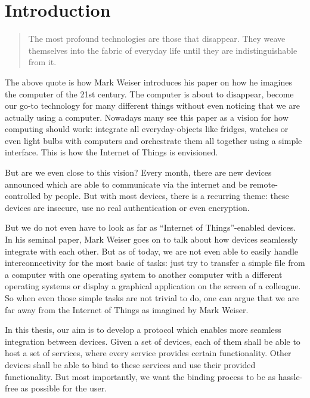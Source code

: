 \section{Introduction}

\begin{quote}
    The most profound technologies are those that disappear.
    They weave themselves into the fabric of everyday life until they are indistinguishable from it. \cite{weiser1991computer}
\end{quote}

The above quote is how Mark Weiser introduces his paper on how he imagines the computer of the 21st century.
The computer is about to disappear, become our go-to technology for many different things without even noticing that we are actually using a computer.
Nowadays many see this paper as a vision for how computing should work: integrate all everyday-objects like fridges, watches or even light bulbs with computers and orchestrate them all together using a simple interface.
This is how the Internet of Things is envisioned.

But are we even close to this vision?
Every month, there are new devices announced which are able to communicate via the internet and be remote-controlled by people.
But with most devices, there is a recurring theme: these devices are insecure, use no real authentication or even encryption.

But we do not even have to look as far as ``Internet of Things''-enabled devices.
In his seminal paper, Mark Weiser goes on to talk about how devices seamlessly integrate with each other.
But as of today, we are not even able to easily handle interconnectivity for the most basic of tasks: just try to transfer a simple file from a computer with one operating system to another computer with a different operating systems or display a graphical application on the screen of a colleague.
So when even those simple tasks are not trivial to do, one can argue that we are far away from the Internet of Things as imagined by Mark Weiser.

In this thesis, our aim is to develop a protocol which enables more seamless integration between devices.
Given a set of devices, each of them shall be able to host a set of services, where every service provides certain functionality.
Other devices shall be able to bind to these services and use their provided functionality.
But most importantly, we want the binding process to be as hassle-free as possible for the user.

